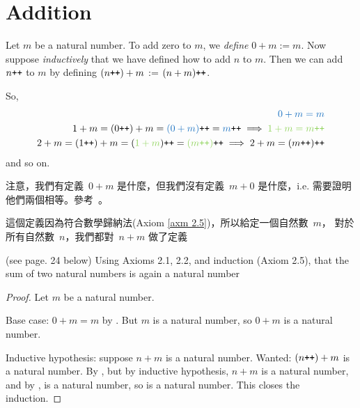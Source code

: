 \section{Addition}\label{sec 2.2}

\begin{definition}  \label{def 2.2.1} Let \(m\) be a natural number. To add zero to \(m\), we \emph{define} \(0 + m := m\). Now suppose \emph{inductively} that we have defined how to add \(n\) to \(m\). Then we can add \(n\texttt{++} \) to \(m\) by defining \((n\texttt{++}) + m\) := \((n + m)\texttt{++}\).
\end{definition}
\begin{note}
So,
\begin{align*}
\BLUE{0 + m = m}\\
1 + m = (0\INC) + m = \BLUE{(0 + m)}\INC = \BLUE{m}\INC \implies \GREEN{1 + m = m\INC} \\
2 + m = (1\INC) + m = (\GREEN{1 + m})\INC = \GREEN{(m\INC)}\INC \implies 2 + m = (m\INC)\INC
\end{align*}
and so on.
\end{note}
\begin{note}
注意，我們有定義\ \(0 + m\) 是什麼，但我們沒有定義\ \(m + 0\) 是什麼，i.e. 需要證明他們兩個相等。參考\ 。
\end{note}
\begin{note}
這個定義因為符合數學歸納法(Axiom \ref{axm 2.5})，所以給定一個自然數\ \(m\)， 對於所有自然數\ \(n\)，我們都對\ \(n + m\) 做了定義
\end{note}

\begin{additional corollary}\label{ac 2.2.1} (see page. 24 below) Using Axioms 2.1, 2.2, and induction (Axiom 2.5), that the sum of two natural numbers is again a natural number 
\end{additional corollary}
\begin{proof}
Let \(m\) be a natural number.

Base case: \(0 + m = m\) by . But \(m\) is a natural number, so \(0 + m\) is a natural number. 

Inductive hypothesis: suppose \(n + m\) is a natural number. Wanted: \((n\texttt{++}) + m\) is a natural number. By  , but by inductive hypothesis, \(n + m\) is a natural number, and by ,  is a natural number, so  is a natural number. This closes the induction.
\end{proof}

